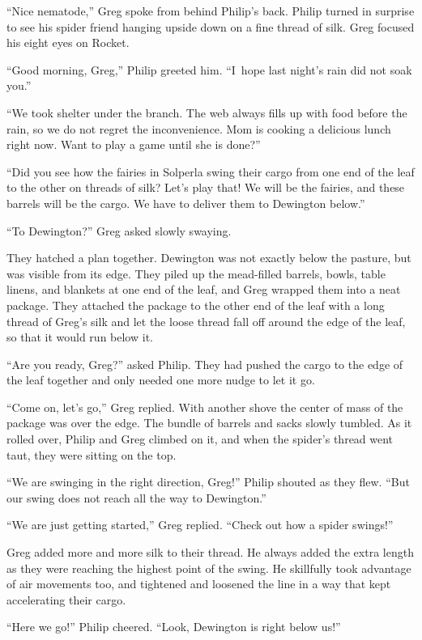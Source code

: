 \documentclass[10pt]{memoir}
\begin{document}
``Nice nematode,'' Greg spoke from behind Philip's back. Philip turned in
surprise to see his spider friend hanging upside down on a fine thread of silk.
Greg focused his eight eyes on Rocket.

``Good morning, Greg,'' Philip greeted him. ``I~hope last night's rain did not
soak you.''

``We took shelter under the branch. The web always fills up with food before
the rain, so we do not regret the inconvenience. Mom is cooking a delicious
lunch right now. Want to play a game until she is done?''

``Did you see how the fairies in Solperla swing their cargo from one end of the
leaf to the other on threads of silk? Let's play that! We will be the fairies,
and these barrels will be the cargo. We have to deliver them to Dewington
below.''

``To Dewington?'' Greg asked slowly swaying.

They hatched a plan together. Dewington was not exactly below the pasture, but
was visible from its edge. They piled up the mead-filled barrels, bowls, table
linens, and blankets at one end of the leaf, and Greg wrapped them into a neat
package. They attached the package to the other end of the leaf with a long
thread of Greg's silk and let the loose thread fall off around the edge of the
leaf, so that it would run below it.

``Are you ready, Greg?'' asked Philip. They had pushed the cargo to the edge of
the leaf together and only needed one more nudge to let it go.

``Come on, let's go,'' Greg replied. With another shove the center of mass of
the package was over the edge. The bundle of barrels and sacks slowly tumbled.
As it rolled over, Philip and Greg climbed on it, and when the spider's thread
went taut, they were sitting on the top.

``We are swinging in the right direction, Greg!'' Philip shouted as they flew.
``But our swing does not reach all the way to Dewington.''

``We are just getting started,'' Greg replied. ``Check out how a spider
swings!''

Greg added more and more silk to their thread. He always added the extra length
as they were reaching the highest point of the swing. He skillfully took
advantage of air movements too, and tightened and loosened the line in a way
that kept accelerating their cargo.

``Here we go!'' Philip cheered. ``Look, Dewington is right below us!''
\end{document}

